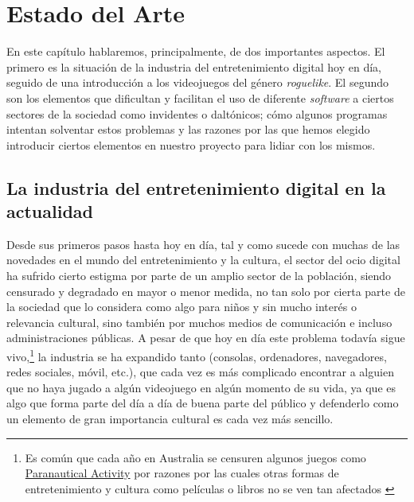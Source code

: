 \chapter{Estado del Arte}

En este capítulo hablaremos, principalmente, de dos importantes aspectos. El primero es la situación de la industria del entretenimiento digital hoy en día, seguido de una introducción a los videojuegos del género \textit{roguelike}. El segundo son los elementos que dificultan y facilitan el uso de diferente \textit{software} a ciertos sectores de la sociedad como invidentes o daltónicos; cómo algunos programas intentan solventar estos problemas y las razones por las que hemos elegido introducir ciertos elementos en nuestro proyecto para lidiar con los mismos.

\section{La industria del entretenimiento digital en la actualidad}

Desde sus primeros pasos hasta hoy en día, tal y como sucede con muchas de las novedades en el mundo del entretenimiento y la cultura, el sector del ocio digital ha sufrido cierto estigma por parte de un amplio sector de la población, siendo censurado y degradado en mayor o menor medida, no tan solo por cierta parte de la sociedad que lo considera como algo para niños y sin mucho interés o relevancia cultural, sino también por muchos medios de comunicación e incluso administraciones públicas. A pesar de que hoy en día este problema todavía sigue vivo,\footnote{Es común que cada año en Australia se censuren algunos juegos como \href{http://goo.gl/hFrQah}{Paranautical Activity} por razones por las cuales otras formas de entretenimiento y cultura como películas o libros no se ven tan afectados \cite{australiabanned}} la industria se ha expandido tanto (consolas, ordenadores, navegadores, redes sociales, móvil, etc.), que cada vez es más complicado encontrar a alguien que no haya jugado a algún videojuego en algún momento de su vida, ya que es algo que forma parte del día a día de buena parte del público y defenderlo como un elemento de gran importancia cultural es cada vez más sencillo.

